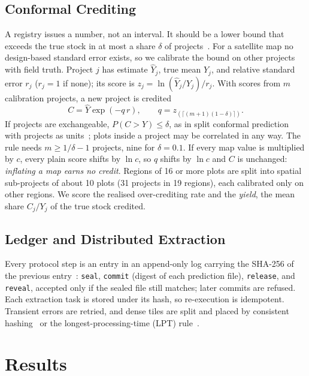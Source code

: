 \documentclass[conference,a4paper]{IEEEtran}
\begin{document}
\subsection{Conformal Crediting}
A registry issues a number, not an interval. It should be a lower bound that exceeds the true stock in at most a share $\delta$ of projects~\cite{grassi2008applying,neeff2021risk}. For a satellite map no design-based standard error exists, so we calibrate the bound on other projects with field truth. Project $j$ has estimate $\hat Y_j$, true mean $Y_j$, and relative standard error $r_j$ ($r_j=1$ if none); its score is $z_j=\ln(\hat Y_j/Y_j)/r_j$. With scores from $m$ calibration projects, a new project is credited
\begin{equation}
C=\hat Y\exp(-q\,r),\qquad q=z_{(\lceil (m+1)(1-\delta)\rceil)}.
\label{eq:cc}
\end{equation}
If projects are exchangeable, $P(C>Y)\le\delta$, as in split conformal prediction with projects as units~\cite{lei2018distribution}; plots inside a project may be correlated in any way. The rule needs $m\ge1/\delta-1$ projects, nine for $\delta=0.1$. If every map value is multiplied by $c$, every plain score shifts by $\ln c$, so $q$ shifts by $\ln c$ and $C$ is unchanged: \emph{inflating a map earns no credit}. Regions of 16 or more plots are split into spatial sub-projects of about 10 plots (31 projects in 19 regions), each calibrated only on other regions. We score the realised over-crediting rate and the \emph{yield}, the mean share $C_j/Y_j$ of the true stock credited.

\subsection{Ledger and Distributed Extraction}
Every protocol step is an entry in an append-only log carrying the SHA-256 of the previous entry~\cite{haber1991timestamp}: \texttt{seal}, \texttt{commit} (digest of each prediction file), \texttt{release}, and \texttt{reveal}, accepted only if the sealed file still matches; later commits are refused. Each extraction task is stored under its hash, so re-execution is idempotent. Transient errors are retried, and dense tiles are split and placed by consistent hashing~\cite{karger1997consistent} or the longest-processing-time (LPT) rule~\cite{graham1969bounds}.

\section{Results}
\end{document}
